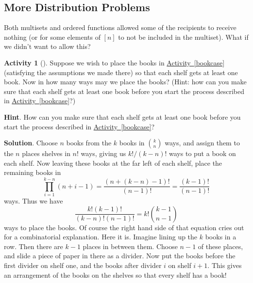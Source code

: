 \documentclass[10pt,]{book}
\theoremstyle{plain}
\theoremstyle{definition}
\theoremstyle{definition}
\theoremstyle{definition}
\newtheorem{activity}[project]{Activity}
\theoremstyle{definition}
\numberwithin{equation}{chapter}
\begin{document}
\subsection[{More Distribution Problems}]{More Distribution Problems}\label{subsec-moredistributions}
\hypertarget{p-760}{}%
Both multisets and ordered functions allowed some of the recipients to receive nothing (or for some elements of \([n]\) to not be included in the multiset).  What if we didn't want to allow this?%
\begin{activity}[]\label{bookcaseeveryshelf}
\hypertarget{p-761}{}%
Suppose we wish to place the books in \hyperref[bookcase]{Activity~\ref{bookcase}} (satisfying the assumptions we made there) so that each shelf gets at least one book. Now in how many ways may we place the books? (Hint: how can you make sure that each shelf gets at least one book before you start the process described in \hyperref[bookcase]{Activity~\ref{bookcase}}?)%
\par\smallskip%
\noindent\textbf{Hint}.\hypertarget{hint-61}{}\quad%
\hypertarget{p-762}{}%
How can you make sure that each shelf gets at least one book before you start the process described in \hyperref[bookcase]{Activity~\ref{bookcase}}?%
\par\smallskip%
\noindent\textbf{Solution}.\hypertarget{solution-70}{}\quad%
\hypertarget{p-763}{}%
Choose \(n\) books from the \(k\) books in \(\binom{k}{n}\) ways, and assign them to the \(n\) places shelves in \(n!\) ways, giving us \(k!/(k-n)!\) ways to put a book on each shelf. Now leaving these books at the far left of each shelf, place the remaining books in%
\begin{equation*}
\prod_{i=1}^{k-n}
(n+i-1)=\frac{(n+(k-n)-1)!}{(n-1)!}=\frac{(k-1)!}{(n-1)!}
\end{equation*}
ways. Thus we have%
\begin{equation*}
\frac{k!(k-1)!}{(k-n)!(n-1)!}=k!\binom{k-1}{n-1}
\end{equation*}
ways to place the books. Of course the right hand side of that equation cries out for a combinatorial explanation. Here it is. Imagine lining up the \(k\) books in a row. Then there are \(k-1\) places in between them. Choose \(n-1\) of these places, and slide a piece of paper in there as a divider. Now put the books before the first divider on shelf one, and the books after divider \(i\) on shelf \(i+1\). This gives an arrangement of the books on the shelves so that every shelf has a book!%
\end{activity}
\hypertarget{p-764}{}%
\end{document}
